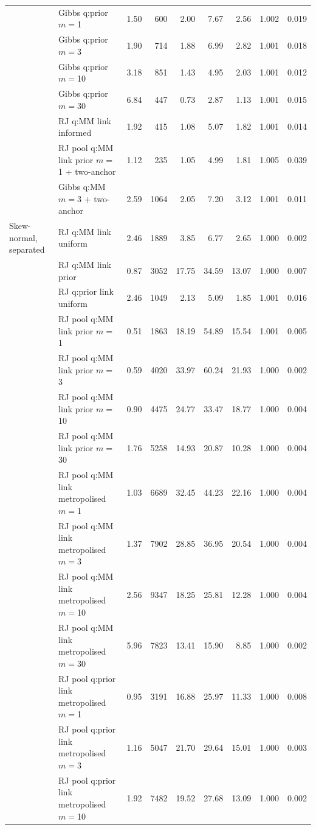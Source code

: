 \begin{tabular}{ll rrrrrrr}
 & Gibbs q:prior $m=$1 & 1.50 & 600 & 2.00 & 7.67 & 2.56 & 1.002 & 0.019 \\
 & Gibbs q:prior $m=$3 & 1.90 & 714 & 1.88 & 6.99 & 2.82 & 1.001 & 0.018 \\
 & Gibbs q:prior $m=$10 & 3.18 & 851 & 1.43 & 4.95 & 2.03 & 1.001 & 0.012 \\
 & Gibbs q:prior $m=$30 & 6.84 & 447 & 0.73 & 2.87 & 1.13 & 1.001 & 0.015 \\
 & RJ q:MM link informed & 1.92 & 415 & 1.08 & 5.07 & 1.82 & 1.001 & 0.014 \\
 & RJ pool q:MM link prior $m=$1 + two-anchor & 1.12 & 235 & 1.05 & 4.99 & 1.81 & 1.005 & 0.039 \\
 & Gibbs q:MM $m=$3 + two-anchor & 2.59 & 1064 & 2.05 & 7.20 & 3.12 & 1.001 & 0.011 \\
\addlinespace
Skew-normal, separated & RJ q:MM link uniform & 2.46 & 1889 & 3.85 & 6.77 & 2.65 & 1.000 & 0.002 \\
 & RJ q:MM link prior & 0.87 & 3052 & 17.75 & 34.59 & 13.07 & 1.000 & 0.007 \\
 & RJ q:prior link uniform & 2.46 & 1049 & 2.13 & 5.09 & 1.85 & 1.001 & 0.016 \\
 & RJ pool q:MM link prior $m=$1 & 0.51 & 1863 & 18.19 & 54.89 & 15.54 & 1.001 & 0.005 \\
 & RJ pool q:MM link prior $m=$3 & 0.59 & 4020 & 33.97 & 60.24 & 21.93 & 1.000 & 0.002 \\
 & RJ pool q:MM link prior $m=$10 & 0.90 & 4475 & 24.77 & 33.47 & 18.77 & 1.000 & 0.004 \\
 & RJ pool q:MM link prior $m=$30 & 1.76 & 5258 & 14.93 & 20.87 & 10.28 & 1.000 & 0.004 \\
 & RJ pool q:MM link metropolised $m=$1 & 1.03 & 6689 & 32.45 & 44.23 & 22.16 & 1.000 & 0.004 \\
 & RJ pool q:MM link metropolised $m=$3 & 1.37 & 7902 & 28.85 & 36.95 & 20.54 & 1.000 & 0.004 \\
 & RJ pool q:MM link metropolised $m=$10 & 2.56 & 9347 & 18.25 & 25.81 & 12.28 & 1.000 & 0.004 \\
 & RJ pool q:MM link metropolised $m=$30 & 5.96 & 7823 & 13.41 & 15.90 & 8.85 & 1.000 & 0.002 \\
 & RJ pool q:prior link metropolised $m=$1 & 0.95 & 3191 & 16.88 & 25.97 & 11.33 & 1.000 & 0.008 \\
 & RJ pool q:prior link metropolised $m=$3 & 1.16 & 5047 & 21.70 & 29.64 & 15.01 & 1.000 & 0.003 \\
 & RJ pool q:prior link metropolised $m=$10 & 1.92 & 7482 & 19.52 & 27.68 & 13.09 & 1.000 & 0.002 \\

\end{tabular}
